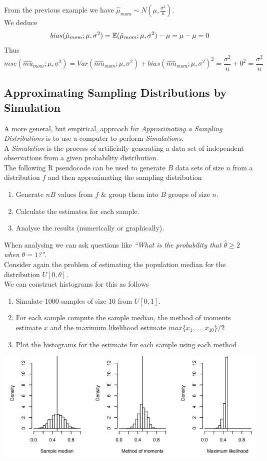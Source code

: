 \documentclass[11pt,a4paper]{article}
\begin{document}
\example{}
From the previous example we have $\hat{\mu}_{mom}\sim N\left(\mu,\frac{\sigma^2}{n}\right)$.\\
We deduce
$$bias(\hat{\mu}_{mom};\mu,\sigma^2)=\mathbb{E}(\hat{\mu}_{mom};\mu,\sigma^2)-\mu=\mu-\mu=0$$
Thus
$$mse(\hat{mu}_{mom};\mu, \sigma^2)=Var(\hat{mu}_{mom};\mu, \sigma^2)+bias(\hat{mu}_{mom};\mu, \sigma^2)^2=\frac{\sigma^2}{n}+0^2=\frac{\sigma^2}{n}$$

\subsection{Approximating Sampling Distributions by Simulation}

\remark{}
A more general, but empirical, approach for \textit{Approximating a Sampling Distributions} is to use a computer to perform \textit{Simulations}.\\

A \textit{Simulation} is the process of artificially generating a data set of independent observations from a given probability distribution.\\

The following R pseudocode can be used to generate $B$ data sets of size $n$ from a distribution $f$ and then approximating the sampling distribution
\begin{enumerate}
	\item Generate $nB$ values from $f$ \& group them into $B$ groups of size $n$.
	\item Calculate the estimates for each sample.
	\item Analyse the results (numerically or graphically).
\end{enumerate}
\nb When analysing we can ask questions like \textit{``What is the probability that $\hat{\theta}\geq2$ when $\theta=1$?"}.\\

Consider again the problem of estimating the population median for the distribution $U[0,\theta]$.\\
We can construct histograms for this as follows
\begin{enumerate}
	\item Simulate 1000 samples of size 10 from $U[0,1]$.
	\item For each sample compute the sample median, the method of moments estimate $\bar{x}$ and the maximum likelihood estimate $max\{x_1,\dots,x_{10}\}/2$
	\item Plot the histograms for the estimate for each sample using each method
\end{enumerate}
\includegraphics[scale=0.5]{img/approximateSimulation.png}
\end{document}
